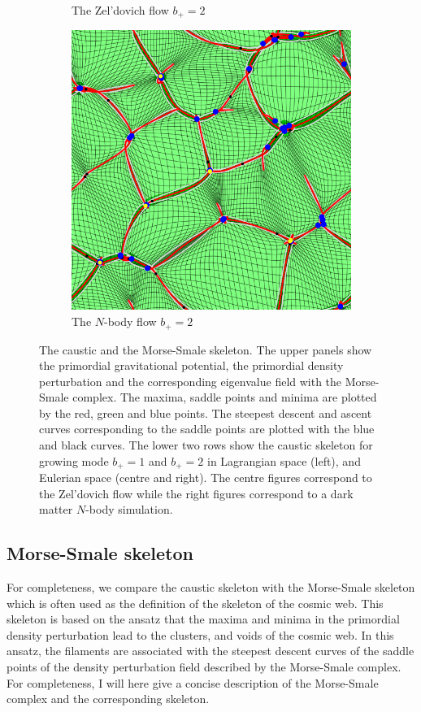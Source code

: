 \documentclass[a4paper, 11pt]{article}
\begin{document}
\begin{figure}
\begin{subfigure}[b]{0.32\textwidth}
\caption{The Zel'dovich flow $b_+=2$}
\label{fig:Zeldovich_2}
\end{subfigure}
\begin{subfigure}[b]{0.32\textwidth}
\includegraphics[width=\textwidth]{Visual_Nbody_D=2}
\caption{The $N$-body flow $b_+=2$}
\label{fig:Nbody_2}
\end{subfigure}
\caption{The caustic and the Morse-Smale skeleton. The upper panels show the primordial gravitational potential, the primordial density perturbation and the corresponding eigenvalue field with the Morse-Smale complex. The maxima, saddle points and minima are plotted by the red, green and blue points. The steepest descent and ascent curves corresponding to the saddle points are plotted with the blue and black curves. The lower two rows show the caustic skeleton for growing mode $b_+=1$ and $b_+=2$ in Lagrangian space (left), and Eulerian space (centre and right). The centre figures correspond to the Zel'dovich flow while the right figures correspond to a dark matter $N$-body simulation.}
\label{fig:visualization}
\end{figure}


\subsection{Morse-Smale skeleton}
For completeness, we compare the caustic skeleton with the Morse-Smale skeleton which is often used as the definition of the skeleton of the cosmic web. This skeleton is based on the ansatz that the maxima and minima in the primordial density perturbation lead to the clusters, and voids of the cosmic web. In this ansatz, the filaments are associated with the steepest descent curves of the saddle points of the density perturbation field described by the Morse-Smale complex. For completeness, I will here give a concise description of the Morse-Smale complex and the corresponding skeleton.
\end{document}
